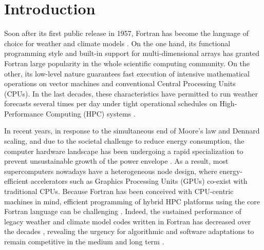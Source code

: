 \documentclass[main.tex]{subfiles}
\begin{document}
	\justifying

	\section{Introduction}
    \label{section:introduction}

        Soon after its first public release in 1957, Fortran has become the language of choice for weather and climate models \citep{mendez14}. On the one hand, its functional programming style and built-in support for multi-dimensional arrays has granted Fortran large popularity in the whole scientific computing community. On the other, its low-level nature guarantees fast execution of intensive mathematical operations on vector machines and conventional Central Processing Units (CPUs). In the last decades, these characteristics have permitted to run weather forecasts several times per day under tight operational schedules on High-Performance Computing (HPC) systems \citep{neumann19}.

        In recent years, in response to the simultaneous end of Moore's law and Dennard scaling, and due to the societal challenge to reduce energy consumption, the computer hardware landscape has been undergoing a rapid specialization to prevent unsustainable growth of the power envelope \citep{muller19}. As a result, most supercomputers nowadays have a heterogeneous node design, where energy-efficient accelerators such as Graphics Processing Units (GPUs) co-exist with traditional CPUs. Because Fortran has been conceived with CPU-centric machines in mind, efficient programming of hybrid HPC platforms using the core Fortran language can be challenging \citep{mendez14, lawrence18}. Indeed, the sustained performance of legacy weather and climate model codes written in Fortran has decreased over the decades \citep{schulthess18}, revealing the urgency for algorithmic and software adaptations to remain competitive in the medium and long term \citep{bauer21}.
\end{document}
